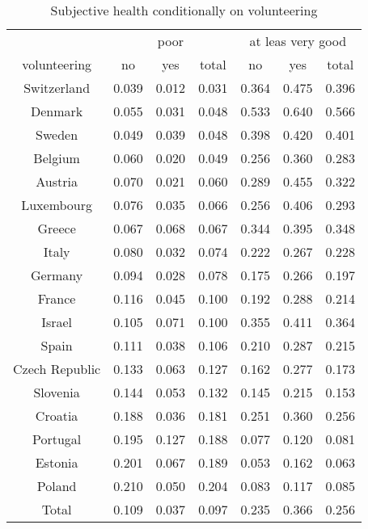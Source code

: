 \begin{table}[H]
  \centering
  \caption{Subjective health conditionally on volunteering}
    \begin{tabular}{ccccccc}
          & \multicolumn{3}{c}{poor} & \multicolumn{3}{c}{at leas very good} \\
    volunteering & no    & yes   & total & no    & yes   & total \\
    Switzerland & 0.039 & 0.012 & 0.031 & 0.364 & 0.475 & 0.396 \\
    Denmark & 0.055 & 0.031 & 0.048 & 0.533 & 0.640 & 0.566 \\
    Sweden & 0.049 & 0.039 & 0.048 & 0.398 & 0.420 & 0.401 \\
    Belgium & 0.060 & 0.020 & 0.049 & 0.256 & 0.360 & 0.283 \\
    Austria & 0.070 & 0.021 & 0.060 & 0.289 & 0.455 & 0.322 \\
    Luxembourg & 0.076 & 0.035 & 0.066 & 0.256 & 0.406 & 0.293 \\
    Greece & 0.067 & 0.068 & 0.067 & 0.344 & 0.395 & 0.348 \\
    Italy & 0.080 & 0.032 & 0.074 & 0.222 & 0.267 & 0.228 \\
    Germany & 0.094 & 0.028 & 0.078 & 0.175 & 0.266 & 0.197 \\
    France & 0.116 & 0.045 & 0.100 & 0.192 & 0.288 & 0.214 \\
    Israel & 0.105 & 0.071 & 0.100 & 0.355 & 0.411 & 0.364 \\
    Spain & 0.111 & 0.038 & 0.106 & 0.210 & 0.287 & 0.215 \\
    Czech Republic & 0.133 & 0.063 & 0.127 & 0.162 & 0.277 & 0.173 \\
    Slovenia & 0.144 & 0.053 & 0.132 & 0.145 & 0.215 & 0.153 \\
    Croatia & 0.188 & 0.036 & 0.181 & 0.251 & 0.360 & 0.256 \\
    Portugal & 0.195 & 0.127 & 0.188 & 0.077 & 0.120 & 0.081 \\
    Estonia & 0.201 & 0.067 & 0.189 & 0.053 & 0.162 & 0.063 \\
    Poland & 0.210 & 0.050 & 0.204 & 0.083 & 0.117 & 0.085 \\
    Total & 0.109 & 0.037 & 0.097 & 0.235 & 0.366 & 0.256 \\
    \end{tabular}%
  \label{tab:addlabel}%
\end{table}%
